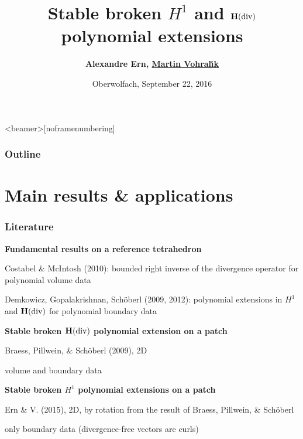 \documentclass[compress]{beamer}
\title[Stable broken $H^1$ \!\!\! \& ${\bf H}(\mathrm{div})$ polynomial extensions\!\!\!\!]
{Stable broken $H^1$ and ${\bf H}(\mathrm{div})$ polynomial extensions}
\author[A. Ern, \underline{M. Vohral\'\i k}]
{{\bf Alexandre Ern, \underline{Martin Vohral\'\i k}}}
\institute[Inria Paris] {
    {\em Inria Paris}}
\date[Oberwolfach, September 22, 2016] %
{Oberwolfach, September 22, 2016}
\begin{document}
\frame[plain]{\titlepage}

\begin{frame}<beamer>[noframenumbering]
    \frametitle{Outline}
    \tableofcontents
\end{frame}


\section[Results \& applications]{Main results \& applications}

\begin{frame}
\frametitle{Literature}

{\bf Fundamental results on a reference tetrahedron}

\bi

\item Costabel \& McIntosh (2010): bounded right inverse of the divergence
operator for polynomial volume data

\item Demkowicz, Gopalakrishnan, Sch{\"o}berl (2009, 2012): polynomial
extensions in $H^1$ and ${\bf H}(\mathrm{div})$ for polynomial boundary data

\ei

\pause

{\bf Stable broken ${\bf H}(\mathrm{div})$ polynomial extension on a patch}

\bi

\item Braess, Pillwein, \& Sch{\"o}berl (2009), 2D

\item volume and boundary data

\ei

\pause

{\bf Stable broken $H^1$ polynomial extensions on a patch}

\bi

\item Ern \& V. (2015), 2D, by rotation from the result of Braess, Pillwein,
\& Sch{\"o}berl

\item only boundary data (divergence-free vectors are curls)

\ei

\end{frame}
\end{document}
